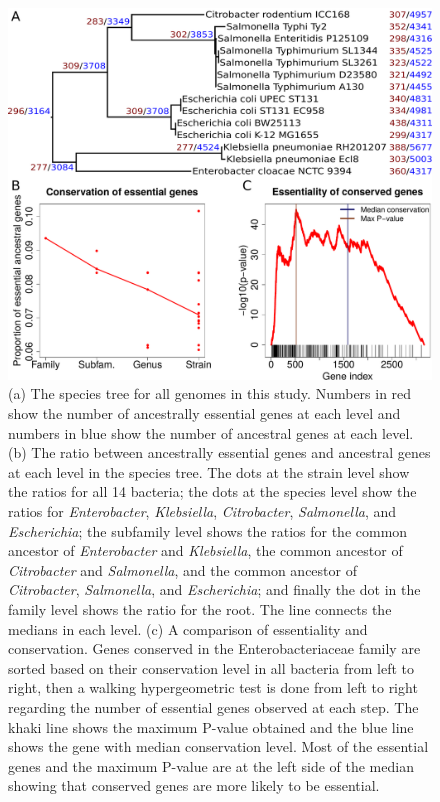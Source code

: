 \documentclass[12pt,letterpaper]{article}
\begin{document}
\begin{figure}
\includegraphics[scale=0.4]{fig4.pdf}
\caption{(a) The species tree for all genomes in this study. Numbers in red show the number of ancestrally essential genes at each level and numbers in blue show the number of ancestral genes at each level. (b) The ratio between ancestrally essential genes and ancestral genes at each level in the species tree. The dots at the strain level show the ratios for all 14 bacteria; the dots at the species level show the ratios for \textit{Enterobacter}, \textit{Klebsiella}, \textit{Citrobacter}, \textit{Salmonella}, and \textit{Escherichia}; the subfamily level shows the ratios for the common ancestor of \textit{Enterobacter} and \textit{Klebsiella}, the common ancestor of \textit{Citrobacter} and \textit{Salmonella}, and the common ancestor of \textit{Citrobacter}, \textit{Salmonella}, and \textit{Escherichia}; and finally the dot in the family level shows the ratio for the root. The line connects the medians in each level. (c) A comparison of essentiality and conservation. Genes conserved in the Enterobacteriaceae family are sorted based on their conservation level in all bacteria from left to right, then a walking hypergeometric test is done from left to right regarding the number of essential genes observed at each step. The khaki line shows the maximum P-value obtained and the blue line shows the gene with median conservation level. Most of the essential genes and the maximum P-value are at the left side of the median showing that conserved genes are more likely to be essential.}
\label{fig:fig4}
\end{figure}
\end{document}
